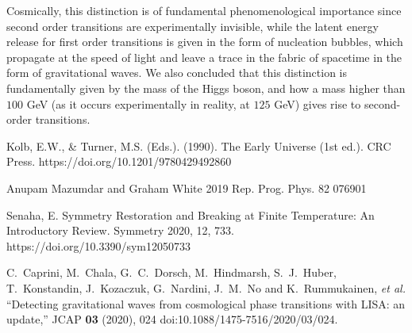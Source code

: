 \documentclass{article}
\numberwithin{equation}{section}
\begin{document}
Cosmically, this distinction is of fundamental phenomenological importance since second order transitions are experimentally invisible, while the latent energy release for first order transitions is given in the form of nucleation bubbles, which propagate at the speed of light and leave a trace in the fabric of spacetime in the form of gravitational waves. We also concluded that this distinction is fundamentally given by the mass of the Higgs boson, and how a mass higher than $100$ GeV (as it occurs experimentally in reality, at $125$ GeV) gives rise to second-order transitions.

\begin{thebibliography}{}
Kolb, E.W., & Turner, M.S. (Eds.). (1990). The Early Universe (1st ed.). CRC Press. https://doi.org/10.1201/9780429492860

Anupam Mazumdar and Graham White 2019 Rep. Prog. Phys. 82 076901

Senaha, E. Symmetry Restoration and Breaking at Finite Temperature: An Introductory Review. Symmetry 2020, 12, 733. https://doi.org/10.3390/sym12050733

C.~Caprini, M.~Chala, G.~C.~Dorsch, M.~Hindmarsh, S.~J.~Huber, T.~Konstandin, J.~Kozaczuk, G.~Nardini, J.~M.~No and K.~Rummukainen, \textit{et al.}
``Detecting gravitational waves from cosmological phase transitions with LISA: an update,''
JCAP \textbf{03} (2020), 024
doi:10.1088/1475-7516/2020/03/024.


\end{thebibliography}
\end{document}
